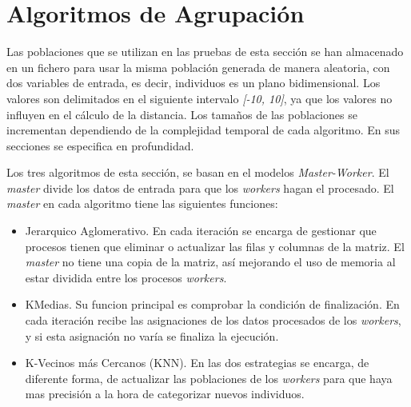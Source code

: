 		
			
			
	


\section{Algoritmos de Agrupación}

	Las poblaciones que se utilizan en las pruebas de esta sección se han almacenado en un fichero para usar la misma población generada de manera aleatoria, con dos variables de entrada, es decir, individuos es un plano bidimensional. Los valores son delimitados en el siguiente intervalo \textit{[-10, 10]}, ya que los valores no influyen en el cálculo de la distancia. Los tamaños de las poblaciones se incrementan dependiendo de la complejidad temporal de cada algoritmo. En sus secciones se especifica en profundidad.	
	
	Los tres algoritmos de esta sección, se basan en el modelos \textit{Master-Worker}. El \textit{master} divide los datos de entrada para que los \textit{workers} hagan el procesado. El \textit{master} en cada algoritmo tiene las siguientes funciones:	
	
	\begin{itemize}
		\item Jerarquico Aglomerativo. En cada iteración se encarga de gestionar que procesos tienen que eliminar o actualizar las filas y columnas de la matriz. El \textit{master} no tiene una copia de la matriz, así mejorando el uso de memoria al estar dividida entre los procesos \textit{workers}.
		\item KMedias. Su funcion principal es comprobar la condición de finalización. En cada iteración recibe las asignaciones de los datos procesados de los \textit{workers}, y si esta asignación no varía se finaliza la ejecución.
		\item K-Vecinos más Cercanos (KNN). En las dos estrategias se encarga, de diferente forma, de actualizar las poblaciones de los \textit{workers} para que haya mas precisión a la hora de categorizar nuevos individuos.
	\end{itemize} 

	
